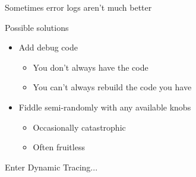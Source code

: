 \documentclass{beamer}
\begin{document}
\begin{frame}
    Sometimes error logs aren't much better
    \begin{figure}[b]
    \begin{centering}
    \end{centering}
    \end{figure}
\end{frame}

\begin{frame}
    Possible solutions
    \begin{itemize}
        \item Add debug code
            \begin{itemize}
                \item You don't always have the code
                \item You can't always rebuild the code you have
            \end{itemize}
        \item Fiddle semi-randomly with any available knobs
            \begin{itemize}
                \item Occasionally catastrophic
                \item Often fruitless
            \end{itemize}
    \end{itemize}
\end{frame}

\begin{frame}
    Enter Dynamic Tracing...
\end{frame}
\end{document}
